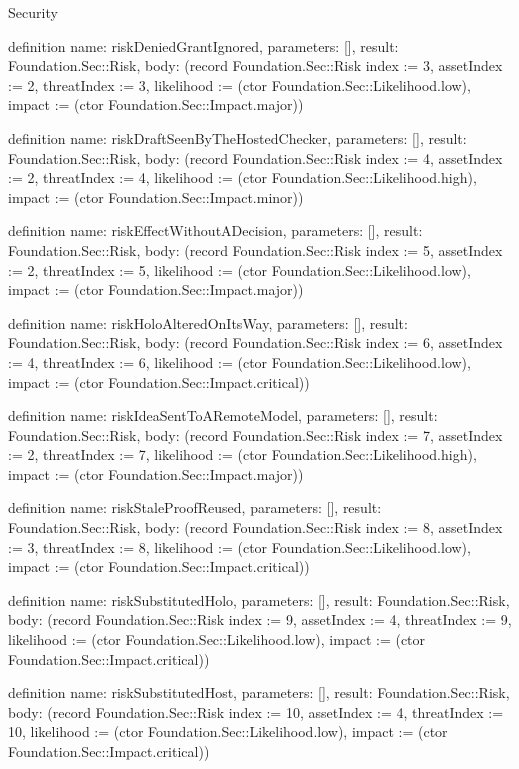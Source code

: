 \begin{lexlean}{Security}
\begin{semanticmodule}
definition{
  name: riskDeniedGrantIgnored,
  parameters: [],
  result: Foundation.Sec::Risk,
  body: (record Foundation.Sec::Risk {index := 3, assetIndex := 2, threatIndex := 3, likelihood := (ctor Foundation.Sec::Likelihood.low), impact := (ctor Foundation.Sec::Impact.major)})
}

definition{
  name: riskDraftSeenByTheHostedChecker,
  parameters: [],
  result: Foundation.Sec::Risk,
  body: (record Foundation.Sec::Risk {index := 4, assetIndex := 2, threatIndex := 4, likelihood := (ctor Foundation.Sec::Likelihood.high), impact := (ctor Foundation.Sec::Impact.minor)})
}

definition{
  name: riskEffectWithoutADecision,
  parameters: [],
  result: Foundation.Sec::Risk,
  body: (record Foundation.Sec::Risk {index := 5, assetIndex := 2, threatIndex := 5, likelihood := (ctor Foundation.Sec::Likelihood.low), impact := (ctor Foundation.Sec::Impact.major)})
}

definition{
  name: riskHoloAlteredOnItsWay,
  parameters: [],
  result: Foundation.Sec::Risk,
  body: (record Foundation.Sec::Risk {index := 6, assetIndex := 4, threatIndex := 6, likelihood := (ctor Foundation.Sec::Likelihood.low), impact := (ctor Foundation.Sec::Impact.critical)})
}

definition{
  name: riskIdeaSentToARemoteModel,
  parameters: [],
  result: Foundation.Sec::Risk,
  body: (record Foundation.Sec::Risk {index := 7, assetIndex := 2, threatIndex := 7, likelihood := (ctor Foundation.Sec::Likelihood.high), impact := (ctor Foundation.Sec::Impact.major)})
}

definition{
  name: riskStaleProofReused,
  parameters: [],
  result: Foundation.Sec::Risk,
  body: (record Foundation.Sec::Risk {index := 8, assetIndex := 3, threatIndex := 8, likelihood := (ctor Foundation.Sec::Likelihood.low), impact := (ctor Foundation.Sec::Impact.critical)})
}

definition{
  name: riskSubstitutedHolo,
  parameters: [],
  result: Foundation.Sec::Risk,
  body: (record Foundation.Sec::Risk {index := 9, assetIndex := 4, threatIndex := 9, likelihood := (ctor Foundation.Sec::Likelihood.low), impact := (ctor Foundation.Sec::Impact.critical)})
}

definition{
  name: riskSubstitutedHost,
  parameters: [],
  result: Foundation.Sec::Risk,
  body: (record Foundation.Sec::Risk {index := 10, assetIndex := 4, threatIndex := 10, likelihood := (ctor Foundation.Sec::Likelihood.low), impact := (ctor Foundation.Sec::Impact.critical)})
}


\end{semanticmodule}
\end{lexlean}
